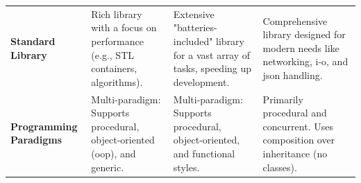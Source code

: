 \begin{table}
\begin{tabularx}{\textwidth}{
		>{\raggedright\arraybackslash}p{}
		>{\raggedright\arraybackslash}X
		>{\raggedright\arraybackslash}X
		>{\raggedright\arraybackslash}X
	}
		\textbf{Standard Library} &
		Rich library with a focus on performance (e.g., STL containers, algorithms). &
		Extensive "batteries-included" library for a vast array of tasks, speeding up development. &
		Comprehensive library designed for modern needs like networking, \gls{i-o}, and \gls{json} handling. \\
		\addlinespace
		
		\textbf{Programming Paradigms} &
		Multi-paradigm: Supports procedural, object-oriented (\gls{oop}), and \gls{generic}. &
		Multi-paradigm: Supports procedural, object-oriented, and functional styles. &
		Primarily procedural and concurrent. Uses composition over inheritance (no classes). \\
		\bottomrule
	\end{tabularx}
\end{table}


